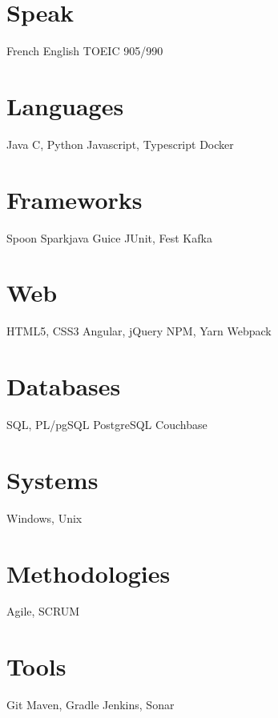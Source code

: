 \documentclass[hidelinks]{cv-style}          %
\begin{document}
\poste{}

\begin{aside}
\section{Speak}
French
English
TOEIC 905/990
%
\section{Languages}
Java
C, Python
Javascript, Typescript
Docker
\section{Frameworks}
Spoon
Sparkjava
Guice
JUnit, Fest
Kafka
\section{Web}
HTML5, CSS3
Angular, jQuery
NPM, Yarn
Webpack
\section{Databases}
SQL, PL/pgSQL
PostgreSQL
Couchbase 
\section{Systems}
Windows, Unix	
\section{Methodologies}
Agile, SCRUM
\section{Tools}
Git
Maven, Gradle
Jenkins, Sonar
%
\end{aside}






\end{document}

